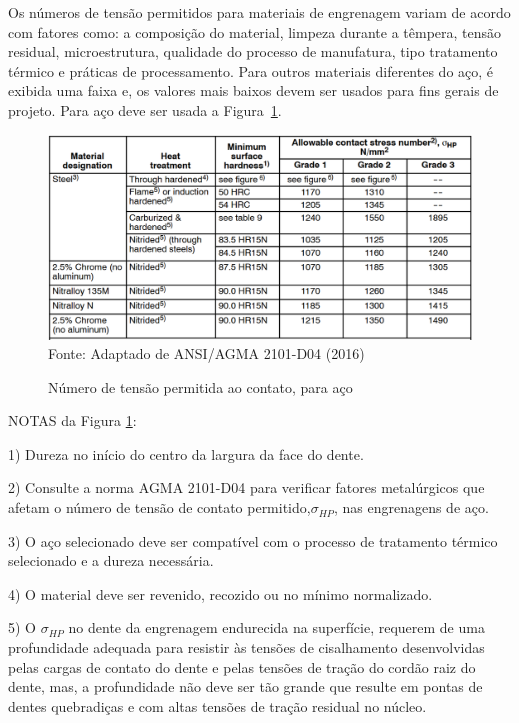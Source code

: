 \documentclass[12pt,a4paper]{article}
\begin{document}
Os números de tensão permitidos para materiais de engrenagem variam de
acordo com fatores como: a composição do material, limpeza durante a
têmpera, tensão residual, microestrutura, qualidade do processo de
manufatura, tipo tratamento térmico e práticas de processamento. Para
outros materiais diferentes do aço, é exibida uma faixa e, os valores
mais baixos devem ser usados para fins gerais de projeto. Para aço deve
ser usada a Figura~{\ref{fig:20}}.

\begin{figure}[!htb]
    \centering
    \caption{Número de tensão permitida ao contato, para aço}
    \includegraphics[scale=0.55]{Imagens/Img20.png}\\
    {\footnotesize Fonte: Adaptado de ANSI/AGMA 2101-D04 (2016)}
    \label{fig:20}
\end{figure}

NOTAS da Figura \ref{fig:20}:

1) Dureza no início do centro da largura da face do dente.

2) Consulte a norma AGMA 2101-D04 para verificar fatores metalúrgicos
que afetam o número de tensão de contato
permitido,$\sigma_{HP}$, nas engrenagens de aço.

3) O aço selecionado deve ser compatível com o processo de tratamento
térmico selecionado e a dureza necessária.

4) O material deve ser revenido, recozido ou no mínimo normalizado.

5) O $\sigma_{HP}$ no dente da engrenagem endurecida na
superfície, requerem de uma profundidade adequada para resistir às
tensões de cisalhamento desenvolvidas pelas cargas de contato do dente e
pelas tensões de tração do cordão raiz do dente, mas, a profundidade não
deve ser tão grande que resulte em pontas de dentes quebradiças e com
altas tensões de tração residual no núcleo.
\end{document}

